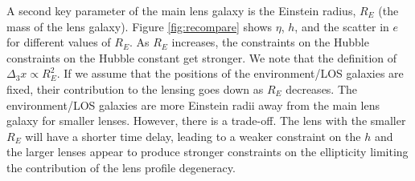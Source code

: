 A second key parameter of the main lens galaxy is the Einstein radius, $R_E$ (the mass of the lens galaxy). Figure \ref{fig:recompare} shows $\eta$, $h$, and the scatter in $e$ for different values of $R_E$. As $R_E$ increases, the constraints on the Hubble constraints on the Hubble constant get stronger. We note that the definition of $\Delta_3 x \propto R_E^2$. If we assume that the positions of the environment/LOS galaxies are fixed, their contribution to the lensing goes down as $R_E$ decreases. The environment/LOS galaxies are more Einstein radii away from the main lens galaxy for smaller lenses. However, there is a trade-off. The lens with the smaller $R_E$ will have a shorter time delay, leading to a weaker constraint on the $h$ and the larger lenses appear to produce stronger constraints on the ellipticity limiting the contribution of the lens profile degeneracy.
  
